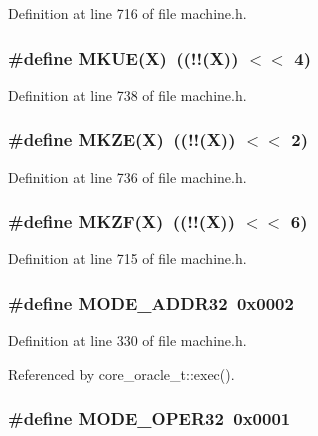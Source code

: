 Definition at line 716 of file machine.h.
\subsubsection[{MKUE}]{\setlength{\rightskip}{0pt plus 5cm}\#define MKUE(X)~((!!(X)) $<$$<$ 4)}\label{machine_8h_6546ccf67657a1acb810dd211c507b5d}




Definition at line 738 of file machine.h.
\subsubsection[{MKZE}]{\setlength{\rightskip}{0pt plus 5cm}\#define MKZE(X)~((!!(X)) $<$$<$ 2)}\label{machine_8h_d8a67fc681fe4013f6422712a77b72f3}




Definition at line 736 of file machine.h.
\subsubsection[{MKZF}]{\setlength{\rightskip}{0pt plus 5cm}\#define MKZF(X)~((!!(X)) $<$$<$ 6)}\label{machine_8h_7d80ab845a46811efb90736ca713038e}




Definition at line 715 of file machine.h.
\subsubsection[{MODE\_\-ADDR32}]{\setlength{\rightskip}{0pt plus 5cm}\#define MODE\_\-ADDR32~0x0002}\label{machine_8h_2e33cca3b4e448fea5e41b0f382b3fd2}




Definition at line 330 of file machine.h.

Referenced by core\_\-oracle\_\-t::exec().
\subsubsection[{MODE\_\-OPER32}]{\setlength{\rightskip}{0pt plus 5cm}\#define MODE\_\-OPER32~0x0001}\label{machine_8h_074e3d3881a165f3030c6a16b364e47f}




